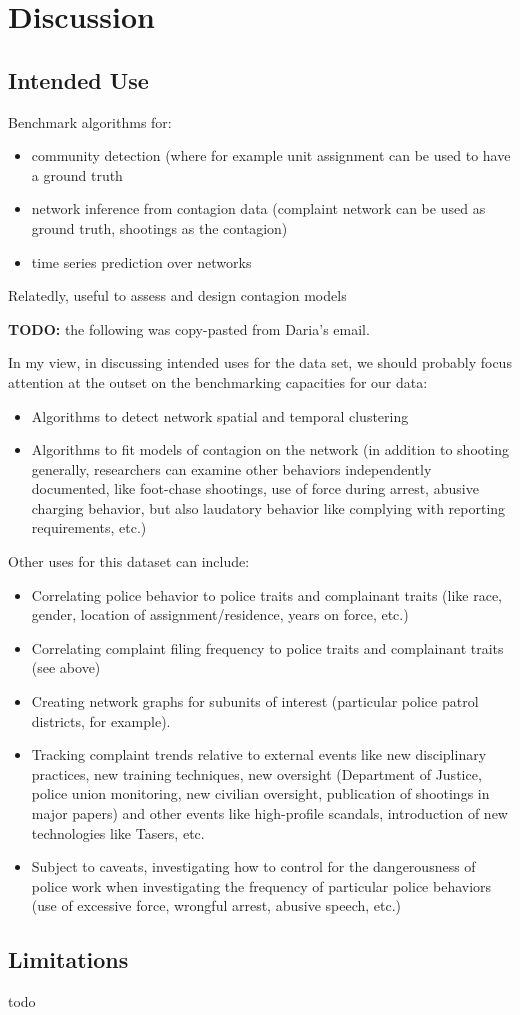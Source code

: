 \section{Discussion}

\subsection{Intended Use}
Benchmark algorithms for:
\begin{itemize}
	\item community detection (where for example unit assignment can be used to
		have a ground truth
	\item network inference from contagion data (complaint network can be used
		as ground truth, shootings as the contagion)
	\item time series prediction over networks
\end{itemize}

Relatedly, useful to assess and design contagion models


\textbf{TODO:} the following was copy-pasted from Daria's email.

In my view, in discussing intended uses for the data set, we should probably focus attention at the outset on the benchmarking capacities for our data:

\begin{itemize}
	\item Algorithms to detect network spatial and temporal clustering
	\item Algorithms to fit models of contagion on the network (in addition to shooting generally, researchers can examine other behaviors independently documented, like foot-chase shootings, use of force during arrest, abusive charging behavior, but also laudatory behavior like complying with reporting requirements, etc.)
\end{itemize}

Other uses for this dataset can include:

\begin{itemize}
	\item Correlating police behavior to police traits and complainant traits (like race, gender, location of assignment/residence, years on force, etc.)
	\item Correlating complaint filing frequency to police traits and complainant traits (see above)
	\item Creating network graphs for subunits of interest (particular police patrol districts, for example).
	\item Tracking complaint trends relative to external events like new disciplinary practices, new training techniques, new oversight (Department of Justice, police union monitoring, new civilian oversight, publication of shootings in major papers) and other events like high-profile scandals, introduction of new technologies like Tasers, etc.
	\item Subject to caveats, investigating how to control for the dangerousness of police work when investigating the frequency of particular police behaviors (use of excessive force, wrongful arrest, abusive speech, etc.)
\end{itemize}

\subsection{Limitations}

todo
